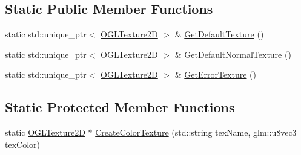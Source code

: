 \subsection*{Static Public Member Functions}
\begin{DoxyCompactItemize}
\item 
static std\+::unique\+\_\+ptr$<$ \hyperlink{class_o_g_l_texture2_d}{O\+G\+L\+Texture2\+D} $>$ \& \hyperlink{class_o_g_l_texture2_d_aeb3f3e851142bc49196052fb1d5d08dc}{Get\+Default\+Texture} ()
\item 
static std\+::unique\+\_\+ptr$<$ \hyperlink{class_o_g_l_texture2_d}{O\+G\+L\+Texture2\+D} $>$ \& \hyperlink{class_o_g_l_texture2_d_a04fd79abfd27a237fb33fc4a16c4fb80}{Get\+Default\+Normal\+Texture} ()
\item 
static std\+::unique\+\_\+ptr$<$ \hyperlink{class_o_g_l_texture2_d}{O\+G\+L\+Texture2\+D} $>$ \& \hyperlink{class_o_g_l_texture2_d_a928c3129e954a9e11f6436286a95c1a0}{Get\+Error\+Texture} ()
\end{DoxyCompactItemize}
\subsection*{Static Protected Member Functions}
\begin{DoxyCompactItemize}
\item 
static \hyperlink{class_o_g_l_texture2_d}{O\+G\+L\+Texture2\+D} $\ast$ \hyperlink{class_o_g_l_texture2_d_ac6df286dd7a9c8a51393106fc49f2138}{Create\+Color\+Texture} (std\+::string tex\+Name, glm\+::u8vec3 tex\+Color)
\end{DoxyCompactItemize}

